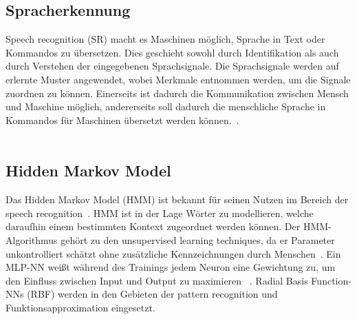 \subsection{Spracherkennung}
Speech recognition (SR) macht es Maschinen möglich, Sprache in Text oder Kommandos zu übersetzen. Dies geschieht sowohl durch Identifikation als auch durch Verstehen der eingegebenen Sprachsignale. Die Sprachsignale werden auf erlernte Muster angewendet, wobei Merkmale entnommen werden, um die Signale zuordnen zu können. Einerseits ist dadurch die Kommunikation zwischen Mensch und Maschine möglich, andererseits soll dadurch die menschliche Sprache in Kommandos für Maschinen übersetzt werden können.~\cite{technology}.\\
\\
\subsection*{Hidden Markov Model}
Das Hidden Markov Model (HMM) ist bekannt für seinen Nutzen im Bereich der speech recognition~\cite{residualnn}. HMM ist in der Lage Wörter zu modellieren, welche daraufhin einem bestimmten Kontext zugeordnet werden können. Der HMM-Algorithmus gehört zu den unsupervised learning techniques, da er Parameter unkontrolliert schätzt ohne zusätzliche Kennzeichnungen durch Menschen~\cite{hmm}. Ein MLP-NN weißt während des Trainings jedem Neuron eine Gewichtung zu, um den Einfluss zwischen Input und Output zu maximieren ~\cite{Khalifelu2012}. Radial Basis Function-NNs (RBF) werden in den Gebieten der pattern recognition und Funktionsapproximation eingesetzt. 


